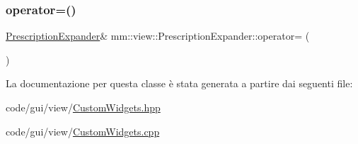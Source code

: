 \subsubsection{\texorpdfstring{operator=()}{operator=()}}
{\footnotesize\ttfamily \hyperlink{classmm_1_1view_1_1_prescription_expander}{Prescription\+Expander}\& mm\+::view\+::\+Prescription\+Expander\+::operator= (\begin{DoxyParamCaption}\item[{\hyperlink{classmm_1_1view_1_1_prescription_expander}{Prescription\+Expander} \&}]{ }\end{DoxyParamCaption})\hspace{0.3cm}{\ttfamily [delete]}}



La documentazione per questa classe è stata generata a partire dai seguenti file\+:\begin{DoxyCompactItemize}
\item 
code/gui/view/\hyperlink{_custom_widgets_8hpp}{Custom\+Widgets.\+hpp}\item 
code/gui/view/\hyperlink{_custom_widgets_8cpp}{Custom\+Widgets.\+cpp}\end{DoxyCompactItemize}
